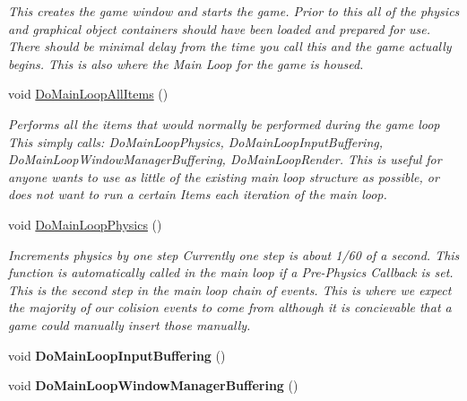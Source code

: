 \begin{DoxyCompactItemize}
\begin{DoxyCompactList}\small\item\em This creates the game window and starts the game. Prior to this all of the physics and graphical object containers should have been loaded and prepared for use. There should be minimal delay from the time you call this and the game actually begins. This is also where the Main Loop for the game is housed. \item\end{DoxyCompactList}\item 
\hypertarget{classPhysWorld_a60b7978b39fc347c2f37077737783da6}{
void \hyperlink{classPhysWorld_a60b7978b39fc347c2f37077737783da6}{DoMainLoopAllItems} ()}
\label{db/df5/classPhysWorld_a60b7978b39fc347c2f37077737783da6}

\begin{DoxyCompactList}\small\item\em Performs all the items that would normally be performed during the game loop This simply calls: DoMainLoopPhysics, DoMainLoopInputBuffering, DoMainLoopWindowManagerBuffering, DoMainLoopRender. This is useful for anyone wants to use as little of the existing main loop structure as possible, or does not want to run a certain Items each iteration of the main loop. \item\end{DoxyCompactList}\item 
\hypertarget{classPhysWorld_a994d7d8c4a9a0c003c3e7d89be7b399b}{
void \hyperlink{classPhysWorld_a994d7d8c4a9a0c003c3e7d89be7b399b}{DoMainLoopPhysics} ()}
\label{db/df5/classPhysWorld_a994d7d8c4a9a0c003c3e7d89be7b399b}

\begin{DoxyCompactList}\small\item\em Increments physics by one step Currently one step is about 1/60 of a second. This function is automatically called in the main loop if a Pre-\/Physics Callback is set. This is the second step in the main loop chain of events. This is where we expect the majority of our colision events to come from although it is concievable that a game could manually insert those manually. \item\end{DoxyCompactList}\item 
\hypertarget{classPhysWorld_a81b3f0dcc0a90d039623f696343e6e9c}{
void {\bfseries DoMainLoopInputBuffering} ()}
\label{db/df5/classPhysWorld_a81b3f0dcc0a90d039623f696343e6e9c}

\item 
\hypertarget{classPhysWorld_ae81bab7f314d98f7b787c508e60c9c9a}{
void {\bfseries DoMainLoopWindowManagerBuffering} ()}
\label{db/df5/classPhysWorld_ae81bab7f314d98f7b787c508e60c9c9a}


\end{DoxyCompactItemize}
